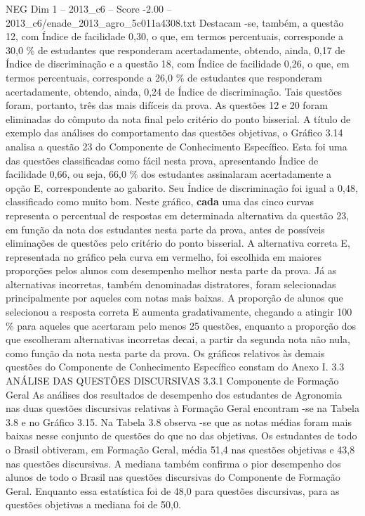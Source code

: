 \begin{textsample}{NEG Dim 1 – 2013\_c6 – Score -2.00 – 2013\_c6/enade\_2013\_agro\_5c011a4308.txt}
Destacam -se, também, a questão 12, com Índice de facilidade 0,30, o que, em termos percentuais, corresponde a 30,0 \% de estudantes que responderam acertadamente, obtendo, ainda, 0,17 de Índice de discriminação e a questão 18, com Índice de facilidade 0,26, o que, em termos percentuais, corresponde a 26,0 \% de estudantes que responderam acertadamente, obtendo, ainda, 0,24 de Índice de discriminação.
Tais questões foram, portanto, três das mais difíceis da prova.
As questões 12 e 20 foram eliminadas do cômputo da nota final pelo critério do ponto bisserial.
A título de exemplo das análises do comportamento das questões objetivas, o Gráfico 3.14 analisa a questão 23 do Componente de Conhecimento Específico.
Esta foi uma das questões classificadas como fácil nesta prova, apresentando Índice de facilidade 0,66, ou seja, 66,0 \% dos estudantes assinalaram acertadamente a opção E, correspondente ao gabarito.
Seu Índice de discriminação foi igual a 0,48, classificado como muito bom.
Neste gráfico, \textbf{cada} uma das cinco curvas representa o percentual de respostas em determinada alternativa da questão 23, em função da nota dos estudantes nesta parte da prova, antes de possíveis eliminações de questões pelo critério do ponto bisserial.
A alternativa correta E, representada no gráfico pela curva em vermelho, foi escolhida em maiores proporções pelos alunos com desempenho melhor nesta parte da prova.
Já as alternativas incorretas, também denominadas distratores, foram selecionadas principalmente por aqueles com notas mais baixas.
A proporção de alunos que selecionou a resposta correta E aumenta gradativamente, chegando a atingir 100 \% para aqueles que acertaram pelo menos 25 questões, enquanto a proporção dos que escolheram alternativas incorretas decai, a partir da segunda nota não nula, como função da nota nesta parte da prova.
Os gráficos relativos às demais questões do Componente de Conhecimento Específico constam do Anexo I. 3.3 ANÁLISE DAS QUESTÕES DISCURSIVAS 3.3.1 Componente de Formação Geral As análises dos resultados de desempenho dos estudantes de Agronomia nas duas questões discursivas relativas à Formação Geral encontram -se na Tabela 3.8 e no Gráfico 3.15.
Na Tabela 3.8 observa -se que as notas médias foram mais baixas nesse conjunto de questões do que no das objetivas.
Os estudantes de todo o Brasil obtiveram, em Formação Geral, média 51,4 nas questões objetivas e 43,8 nas questões discursivas.
A mediana também confirma o pior desempenho dos alunos de todo o Brasil nas questões discursivas do Componente de Formação Geral.
Enquanto essa estatística foi de 48,0 para questões discursivas, para as questões objetivas a mediana foi de 50,0.

\end{textsample}
